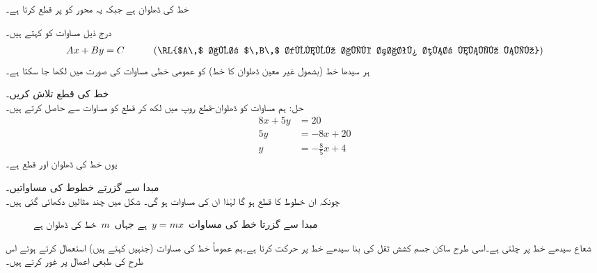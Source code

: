 خط  کی ڈھلوان  ہے جبکہ یہ  محور کو  پر قطع کرتا ہے۔

درج ذیل مساوات کو  کہتے ہیں۔
\begin{align*}
Ax+By=C\quad\quad\quad (\text{\RL{$A\,$ اور $\,B\,$ دونوں ایک ساتھ صفر نہیں ہیں}})
\end{align*}
ہر سیدھا خط (بشمول غیر معین ڈھلوان کا خط) کو عمومی خطی مساوات کی صورت میں لکھا جا سکتا ہے۔ 

خط  کی  قطع تلاش کریں۔\\
حل:\quad
ہم مساوات کو ڈھلوان-قطع روپ میں لکھ کر  قطع کو مساوات سے حاصل کرتے ہیں۔
\begin{align*}
8x+5y&=20\\
5y&=-8x+20\\
y&=-\frac{8}{5}x+4
\end{align*}
یوں خط کی ڈھلوان  اور  قطع  ہے۔

مبدا سے گزرتے خطوط کی مساواتیں۔\\
چونکہ ان خطوط کا  قطع  ہو گا لہٰذا ان کی مساوات  ہو گی۔ شکل  میں چند مثالیں دکھائی گئی ہیں۔
\begin{figure}
\centering
{}
\caption{مبدا سے گزرتا خط کی مساوات $\,y=mx\,$ ہے جہاں $\,m\,$ خط کی ڈھلوان ہے}
\label{شکل_ابتدا_مبدا_گزرتا_خط}
\end{figure}

شعاع سیدھے خط پر چلتی ہے۔اسی طرح ساکن جسم کشش ثقل کی بنا سیدھے خط پر حرکت کرتا ہے۔ہم عموماً خط کی مساوات (جنہیں  کہتے ہیں) استعمال کرتے ہوئے اس طرح کی طبعی اعمال پر غور کرتے ہیں۔ 

